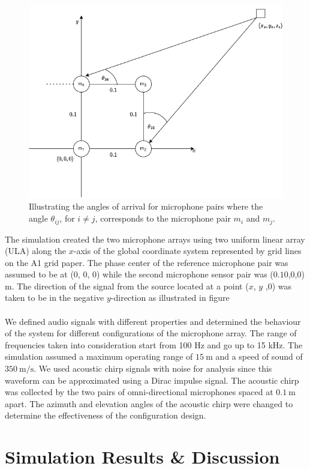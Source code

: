 \documentclass[a4paper,11pt]{article}
\newcommand{\mysection}[2]{\setcounter{section}{#1}\addtocounter{section}{-1}\section{#2}}
\begin{document}
\begin{figure}[ht!]
	\centering
	\includegraphics[width=0.68\linewidth]{triangulation_axes.png}
	\caption{Illustrating the angles of arrival for microphone pairs where the angle $\theta_{ij}$, for $i\neq j$, corresponds to the microphone pair $m_i$ and $m_j$.}
	\label{fig:tri_1}
\end{figure}
The simulation created the two microphone arrays using two uniform linear array (ULA) along the $x$-axis of the global coordinate system represented by grid lines on the A1 grid paper. The phase center of the reference microphone pair was assumed to be at ($0$, $0$, $0$) while the second microphone sensor pair was ($0.10$,$0$,$0$) $\si{\meter}$. The direction of the signal from the source located at a point ($x$, $y$ ,$0$) was taken to be in the negative $y$-direction as illustrated in figure\\\\ %
We defined audio signals with different properties and determined the behaviour of the system for different configurations of the microphone array.  The range of frequencies taken into consideration start from 100 Hz and go up to 15 kHz. The simulation assumed a maximum operating range of $\SI{15}{\meter}$ and a speed of sound of $\SI{350}{\meter\per\second}$. We used acoustic chirp signals with noise for analysis since this waveform can be approximated using a Dirac impulse signal. The acoustic chirp was collected by the two pairs of omni-directional microphones spaced at $\SI{0.1}{\meter}$ apart. The azimuth and elevation angles of the acoustic chirp were changed to determine the effectiveness of the configuration design. 

\mysection{5}{Simulation Results \& Discussion}
\end{document}
